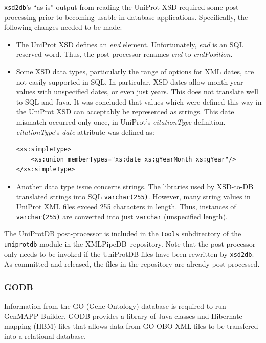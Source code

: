 \documentclass[10pt]{bmc_article}
\newenvironment{bmcformat}{\begin{raggedright}\baselineskip20pt\sloppy\setboolean{publ}{false}}{\end{raggedright}\baselineskip20pt\sloppy}
\def\xmlpipedb{XMLPipeDB}                       %
\def\xsd2db{\texttt{xsd2db}}
\begin{document}
\begin{bmcformat}
\xsd2db's ``as is'' output from reading the UniProt XSD \cite{uniprotxsd} required some post-processing prior to becoming usable in database applications.  Specifically, the following changes needed to be made:
\begin{itemize}
\item The UniProt XSD defines an \textsl{end} element.  Unfortunately, \textsl{end} is an SQL reserved word.  Thus, the post-processor renames \textsl{end} to \textsl{endPosition}.

\item Some XSD data types, particularly the range of options for XML dates, are not easily supported in SQL.  In particular, XSD dates allow month-year values with unspecified dates, or even just years.  This does not translate well to SQL and Java.  It was concluded that values which were defined this way in the UniProt XSD can acceptably be represented as strings.  This date mismatch occurred only once, in UniProt's \textsl{citationType} definition.  \textsl{citationType}'s \textsl{date} attribute was defined as:

\begin{verbatim}
<xs:simpleType>
    <xs:union memberTypes="xs:date xs:gYearMonth xs:gYear"/>
</xs:simpleType>
\end{verbatim}

\item Another data type issue concerns strings.  The libraries used by XSD-to-DB translated strings into SQL \texttt{varchar(255)}.  However, many string values in UniProt XML files exceed 255 characters in length.  Thus, instances of \texttt{varchar(255)} are converted into just \texttt{varchar} (unspecified length).
\end{itemize}
The UniProtDB post-processor is included in the \texttt{tools} subdirectory of the \texttt{uniprotdb} module in the \xmlpipedb\ repository.  Note that the post-processor only needs to be invoked if the UniProtDB files have been rewritten by \xsd2db.  As committed and released, the files in the repository are already post-processed.\pb

\subsubsection*{GODB}

Information from the GO (Gene Ontology) database is required to run GenMAPP Builder.  GODB provides a library of Java classes and Hibernate mapping (HBM) files that allows data from GO OBO XML files to be transfered into a relational database.\pb


\end{bmcformat}
\end{document}
